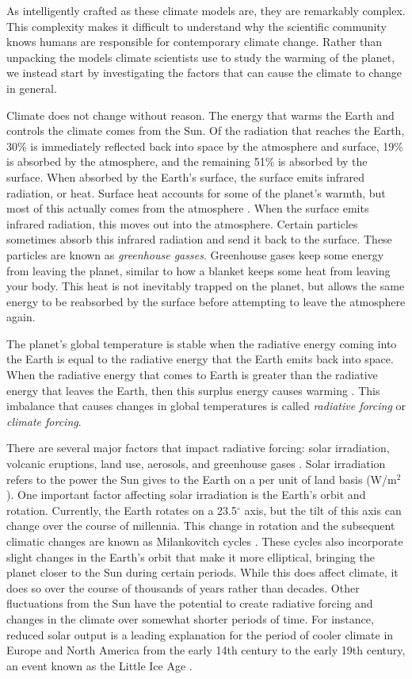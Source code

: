 As intelligently crafted as these climate models are, they are remarkably complex. This complexity makes it difficult to understand why the scientific community knows humans are responsible for contemporary climate change. Rather than unpacking the models climate scientists use to study the warming of the planet, we instead start by investigating the factors that can cause the climate to change in general.

Climate does not change without reason. The energy that warms the Earth and controls the climate comes from the Sun. Of the radiation that reaches the Earth, 30\% is immediately reflected back into space by the atmosphere and surface, 19\% is absorbed by the atmosphere, and the remaining 51\% is absorbed by the surface. When absorbed by the Earth's surface, the surface emits infrared radiation, or heat. Surface heat accounts for some of the planet's warmth, but most of this actually comes from the atmosphere \citep{csi}. When the surface emits infrared radiation, this moves out into the atmosphere. Certain particles sometimes absorb this infrared radiation and send it back to the surface. These particles are known as \emph{greenhouse gasses}. Greenhouse gases keep some energy from leaving the planet, similar to how a blanket keeps some heat from leaving your body. This heat is not inevitably trapped on the planet, but allows the same energy to be reabsorbed by the surface before attempting to leave the atmosphere again.

The planet's global temperature is stable when the radiative energy coming into the Earth is equal to the radiative energy that the Earth emits back into space. When the radiative energy that comes to Earth is greater than the radiative energy that leaves the Earth, then this surplus energy causes warming \citep{noaa}. This imbalance that causes changes in global temperatures is called \emph{radiative forcing} or \emph{climate forcing}.

There are several major factors that impact radiative forcing: solar irradiation, volcanic eruptions, land use, aerosols, and greenhouse gases \citep{SINGH202179}. Solar irradiation refers to the power the Sun gives to the Earth on a per unit of land basis (W/m$^2$). One important factor affecting solar irradiation is the Earth's orbit and rotation. Currently, the Earth rotates on a 23.5$^\circ$ axis, but the tilt of this axis can change over the course of millennia. This change in rotation and the subsequent climatic changes are known as Milankovitch cycles \citep{buis2020global}. These cycles also incorporate slight changes in the Earth's orbit that make it more elliptical, bringing the planet closer to the Sun during certain periods. While this does affect climate, it does so over the course of thousands of years rather than decades. Other fluctuations from the Sun have the potential to create radiative forcing and changes in the climate over somewhat shorter periods of time. For instance, reduced solar output is a leading explanation for the period of cooler climate in Europe and North America from the early 14th century to the early 19th century, an event known as the Little Ice Age \citep{little_ice}.

